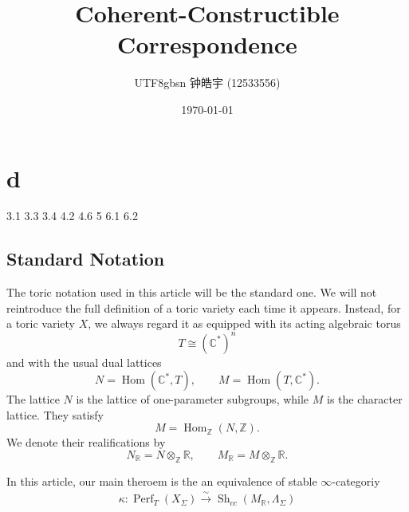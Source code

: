 \documentclass[a4paper,11pt]{article}
\title{Coherent-Constructible Correspondence}
\author{
    \begin{CJK*}{UTF8}{gbsn}
    钟皓宇 (12533556)
    \end{CJK*}
}
\date{\today}
\begin{document}
\maketitle
\tableofcontents
\section{d}
3.1 3.3 3.4 4.2 4.6 5 6.1 6.2 

\subsection{Standard Notation} 
The toric notation used in this article will be the standard one. We will not
reintroduce the full definition of a toric variety each time it appears. Instead,
for a toric variety \(X\), we always regard it as equipped with its acting
algebraic torus
\[
T\cong(\mathbb C^*)^n
\]
and with the usual dual lattices
\[
N=\operatorname{Hom}(\mathbb C^*,T),
\qquad
M=\operatorname{Hom}(T,\mathbb C^*).
\]
The lattice \(N\) is the lattice of one-parameter subgroups, while \(M\) is the
character lattice. They satisfy
\[
M=\operatorname{Hom}_{\mathbb Z}(N,\mathbb Z).
\]
We denote their realifications by
\[
N_{\mathbb R}=N\otimes_{\mathbb Z}\mathbb R,
\qquad
M_{\mathbb R}=M\otimes_{\mathbb Z}\mathbb R.
\]

In this article, our main theroem is the an equivalence of stable $\infty$-categoriy
\begin{align*}
    \kappa:\operatorname{Perf}_T(X_\Sigma) \xrightarrow{\sim} \operatorname{Sh}_{cc}(M_{\mathbb{R}},\Lambda_{\Sigma})
\end{align*}



\end{document}
